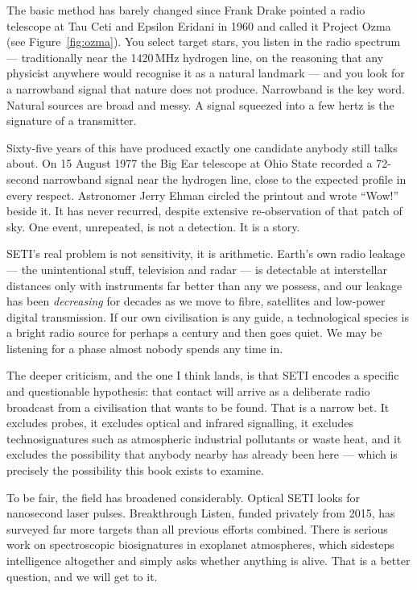 The basic method has barely changed since Frank Drake pointed a radio telescope at Tau
Ceti and Epsilon Eridani in 1960 and called it Project Ozma (see Figure~\ref{fig:ozma}). You select target stars,
you listen in the radio spectrum --- traditionally near the 1420\,MHz hydrogen line, on
the reasoning that any physicist anywhere would recognise it as a natural landmark ---
and you look for a narrowband signal that nature does not produce. Narrowband is the key
word. Natural sources are broad and messy. A signal squeezed into a few hertz is the
signature of a transmitter.

Sixty-five years of this have produced exactly one candidate anybody still talks about.
On 15 August 1977 the Big Ear telescope at Ohio State recorded a 72-second narrowband
signal near the hydrogen line, close to the expected profile in every respect. Astronomer
Jerry Ehman circled the printout and wrote ``Wow!'' beside it. It has never recurred,
despite extensive re-observation of that patch of sky. One event, unrepeated, is not a
detection. It is a story.

\begin{funfact}
SETI's real problem is not sensitivity, it is arithmetic. Earth's own radio
leakage --- the unintentional stuff, television and radar --- is detectable at
interstellar distances only with instruments far better than any we possess, and our
leakage has been \emph{decreasing} for decades as we move to fibre, satellites and
low-power digital transmission. If our own civilisation is any guide, a technological
species is a bright radio source for perhaps a century and then goes quiet. We may be
listening for a phase almost nobody spends any time in.
\end{funfact}

The deeper criticism, and the one I think lands, is that SETI encodes a specific and
questionable hypothesis: that contact will arrive as a deliberate radio broadcast from a
civilisation that wants to be found. That is a narrow bet. It excludes probes, it
excludes optical and infrared signalling, it excludes technosignatures such as
atmospheric industrial pollutants or waste heat, and it excludes the possibility that
anybody nearby has already been here --- which is precisely the possibility this book
exists to examine.

To be fair, the field has broadened considerably. Optical SETI looks for nanosecond laser
pulses. Breakthrough Listen, funded privately from 2015, has surveyed far more targets
than all previous efforts combined. There is serious work on spectroscopic biosignatures
in exoplanet atmospheres, which sidesteps intelligence altogether and simply asks whether
anything is alive. That is a better question, and we will get to it.

